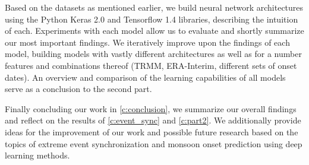 Based on the datasets as mentioned earlier, we build neural network architectures using the Python Keras 2.0 and Tensorflow 1.4 libraries, describing the intuition of each. Experiments with each model allow us to evaluate and shortly summarize our most important findings. We iteratively improve upon the findings of each model, building models with vastly different architectures as well as for a number features and combinations thereof (TRMM, ERA-Interim, different sets of onset dates). An overview and comparison of the learning capabilities of all models serve as a conclusion to the second part.

Finally concluding our work in \cref{c:conclusion}, we summarize our overall findings and reflect on the results of \cref{c:event_sync} and \cref{c:part2}. We additionally provide ideas for the improvement of our work and possible future research based on the topics of extreme event synchronization and monsoon onset prediction using deep learning methods.
